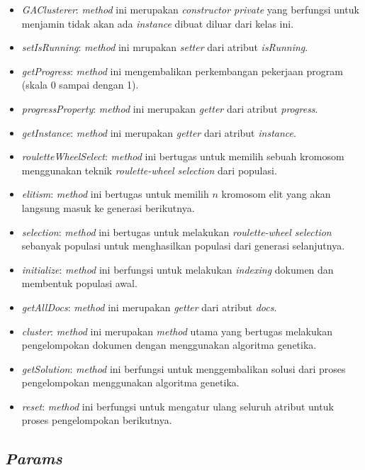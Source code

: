 \begin{itemize}
	\item \textit{GAClusterer}: \textit{method} ini merupakan \textit{constructor private} yang berfungsi untuk menjamin tidak akan ada \textit{instance} dibuat diluar dari kelas ini.
	\item \textit{setIsRunning}: \textit{method} ini mrupakan \textit{setter} dari atribut \textit{isRunning}.
	\item \textit{getProgress}: \textit{method} ini mengembalikan perkembangan pekerjaan program (skala 0 sampai dengan 1).
	\item \textit{progressProperty}: \textit{method} ini merupakan \textit{getter} dari atribut \textit{progress}.
	\item \textit{getInstance}: \textit{method} ini merupakan \textit{getter} dari atribut \textit{instance}.
	\item \textit{rouletteWheelSelect}: \textit{method} ini bertugas untuk memilih sebuah kromosom menggunakan teknik \textit{roulette-wheel selection} dari populasi.
	\item \textit{elitism}: \textit{method} ini bertugas untuk memilih $n$ kromosom elit yang akan langsung masuk ke generasi berikutnya.
	\item \textit{selection}: \textit{method} ini bertugas untuk melakukan \textit{roulette-wheel selection} sebanyak populasi untuk menghasilkan populasi dari generasi selanjutnya.
	\item \textit{initialize}: \textit{method} ini berfungsi untuk melakukan \textit{indexing} dokumen dan membentuk populasi awal.
	\item \textit{getAllDocs}: \textit{method} ini merupakan \textit{getter} dari atribut \textit{docs}.
	\item \textit{cluster}: \textit{method} ini merupakan \textit{method} utama yang bertugas melakukan pengelompokan dokumen dengan menggunakan algoritma genetika.
	\item \textit{getSolution}: \textit{method} ini berfungsi untuk menggembalikan solusi dari proses pengelompokan menggunakan algoritma genetika.
	\item \textit{reset}: \textit{method} ini berfungsi untuk mengatur ulang seluruh atribut untuk proses pengelompokan berikutnya.
\end{itemize}

\subsection{\textit{Params}}


